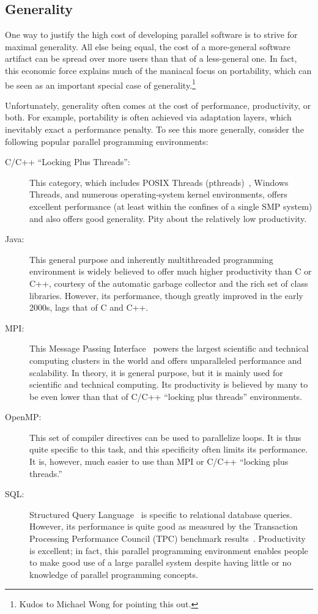 \subsection{Generality}
\label{sec:intro:Generality}

One way to justify the high cost of developing parallel software
is to strive for maximal generality.
All else being equal, the cost of a more-general software artifact
can be spread over more users than that of a less-general one.
In fact, this economic force explains much of the maniacal focus
on portability, which can be seen as an important special case
of generality.\footnote{
	Kudos to Michael Wong for pointing this out.}

Unfortunately, generality often comes at the cost of performance,
productivity, or both.
For example, portability is often achieved via adaptation layers,
which inevitably exact a performance penalty.
To see this more generally, consider the following popular parallel
programming environments:

\begin{description}
\item[C/C++ ``Locking Plus Threads'':] This category, which includes
	POSIX Threads (pthreads)~\cite{OpenGroup1997pthreads},
	Windows Threads, and numerous
	operating-system kernel environments, offers excellent performance
	(at least within the confines of a single SMP system)
	and also offers good generality.
	Pity about the relatively low productivity.
\item[Java:] This general purpose and inherently multithreaded
	programming environment	is widely believed to offer much higher
	productivity than C or C++, courtesy of the automatic garbage collector
	and the rich set of class libraries.
	However, its performance, though greatly improved in the early
	2000s, lags that of C and C++.
\item[MPI:] This Message Passing Interface~\cite{MPIForum2008} powers
	the largest scientific and technical computing clusters in
	the world and offers unparalleled performance and scalability.
	In theory, it is general purpose, but it is mainly used
	for scientific and technical computing.
	Its productivity is believed by many to be even lower than that
	of C/C++ ``locking plus threads'' environments.
\item[OpenMP:] This set of compiler directives can be used
	to parallelize loops.  It is thus quite specific to this
	task, and this specificity often limits its performance.
	It is, however, much easier to use than MPI or C/C++
	``locking plus threads.''
\item[SQL:] Structured Query Language~\cite{DIS9075SQL92} is
	specific to relational database queries.
	However, its performance is quite good as measured by the
	Transaction Processing Performance Council (TPC)
	benchmark results~\cite{TPC}.
	Productivity is excellent; in fact, this parallel programming
	environment enables people to make good use of a large parallel
	system despite having little or no knowledge of parallel
	programming concepts.
\end{description}

